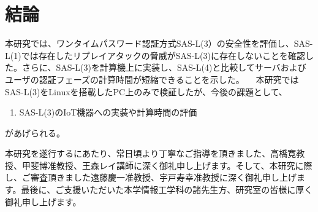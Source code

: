 \documentclass{thesis}
\begin{document}
		
\chapter{結論}
本研究では、ワンタイムパスワード認証方式SAS-L(3）の安全性を評価し、SAS-L(1)では存在したリプレイアタックの脅威がSAS-L(3)に存在しないことを確認した。さらに、SAS-L(3)を計算機上に実装し、SAS-L(4)と比較してサーバおよびユーザの認証フェーズの計算時間が短縮できることを示した。
　本研究ではSAS-L(3)をLinuxを搭載したPC上のみで検証したが、今後の課題として、
\begin{enumerate}[・]
				\item SAS-L(3)のIoT機器への実装や計算時間の評価
\end{enumerate}
があげられる。





\acknowledgement

本研究を遂行するにあたり、常日頃より丁寧なご指導を頂きました、高橋寛教授、甲斐博准教授、王森レイ講師に深く御礼申し上げます。そして、本研究に際し、ご審査頂きました遠藤慶一准教授、宇戸寿幸准教授に深く御礼申し上げます。最後に、ご支援いただいた本学情報工学科の諸先生方、研究室の皆様に厚く御礼申し上げます。
\end{document}
